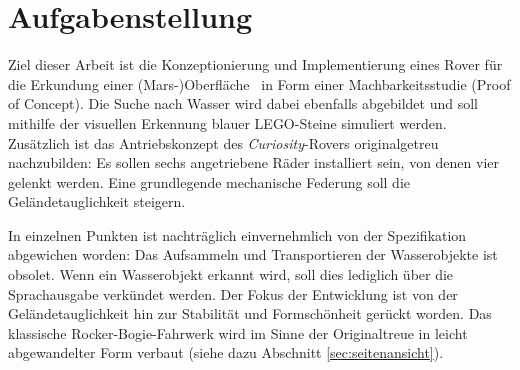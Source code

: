 \section{Aufgabenstellung}
\label{sec:aufgabe}

Ziel dieser Arbeit ist die \glqq Konzeptionierung und Implementierung eines Rover für die Erkundung einer (Mars-)Oberfläche\grqq\ \cite{mueller2019} in Form einer Machbarkeitsstudie (Proof of Concept).
Die Suche nach Wasser wird dabei ebenfalls abgebildet und soll mithilfe der visuellen Erkennung blauer LEGO-Steine simuliert werden.
Zusätzlich ist das Antriebskonzept des \textit{Curiosity}-Rovers originalgetreu nachzubilden: Es sollen sechs angetriebene Räder installiert sein, von denen vier gelenkt werden.
Eine grundlegende mechanische Federung soll die Geländetauglichkeit steigern.

In einzelnen Punkten ist nachträglich einvernehmlich von der Spezifikation abgewichen worden:
Das Aufsammeln und Transportieren der Wasserobjekte ist obsolet.
Wenn ein Wasserobjekt erkannt wird, soll dies lediglich über die Sprachausgabe verkündet werden.
Der Fokus der Entwicklung ist von der Geländetauglichkeit hin zur Stabilität und Formschönheit gerückt worden.
Das klassische Rocker-Bogie-Fahrwerk wird im Sinne der Originaltreue in leicht abgewandelter Form verbaut (siehe dazu Abschnitt \ref{sec:seitenansicht}).